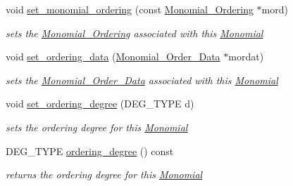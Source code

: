\begin{Indent}
\begin{DoxyCompactItemize}
void \hyperlink{group__polygroup_a78be0a586fdca4bedaaaf8006a57d90e}{set\+\_\+monomial\+\_\+ordering} (const \hyperlink{group__orderinggroup_class_monomial___ordering}{Monomial\+\_\+\+Ordering} $\ast$mord)
\begin{DoxyCompactList}\small\item\em sets the \hyperlink{group__orderinggroup_class_monomial___ordering}{Monomial\+\_\+\+Ordering} associated with this \hyperlink{group__polygroup_class_monomial}{Monomial} \end{DoxyCompactList}\item 
\mbox{\label{group__polygroup_afc14eaf6e15b94990b469e941d3c546d}} 
void \hyperlink{group__polygroup_afc14eaf6e15b94990b469e941d3c546d}{set\+\_\+ordering\+\_\+data} (\hyperlink{group__orderinggroup_class_monomial___order___data}{Monomial\+\_\+\+Order\+\_\+\+Data} $\ast$mordat)
\begin{DoxyCompactList}\small\item\em sets the \hyperlink{group__orderinggroup_class_monomial___order___data}{Monomial\+\_\+\+Order\+\_\+\+Data} associated with this \hyperlink{group__polygroup_class_monomial}{Monomial} \end{DoxyCompactList}\item 
\mbox{\label{group__polygroup_a6d0118da218d7c7d70c11c1426d72d48}} 
void \hyperlink{group__polygroup_a6d0118da218d7c7d70c11c1426d72d48}{set\+\_\+ordering\+\_\+degree} (D\+E\+G\+\_\+\+T\+Y\+PE d)
\begin{DoxyCompactList}\small\item\em sets the ordering degree for this \hyperlink{group__polygroup_class_monomial}{Monomial} \end{DoxyCompactList}\item 
\mbox{\label{group__polygroup_aee8d68e55ce2f37c01b0243f87971fb6}} 
D\+E\+G\+\_\+\+T\+Y\+PE \hyperlink{group__polygroup_aee8d68e55ce2f37c01b0243f87971fb6}{ordering\+\_\+degree} () const
\begin{DoxyCompactList}\small\item\em returns the ordering degree for this \hyperlink{group__polygroup_class_monomial}{Monomial} \end{DoxyCompactList}\item 
\mbox{\label{group__polygroup_a063e7166a4bf8abc8748f8758cc31d73}} 

\end{DoxyCompactItemize}
\end{Indent}
